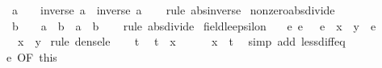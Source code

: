 \begin{isabellebody}
\ \ {\isachardoublequoteopen}a\ {\isasymnoteq}\ {}\ {\isasymLongrightarrow}\ {\isasymbar}inverse\ a{\isasymbar}\ {\isacharequal}{\kern0pt}\ inverse\ {\isasymbar}a{\isasymbar}{\isachardoublequoteclose}\isanewline
%
\isadelimproof
\ \ %
\endisadelimproof
%
\isatagproof
{}\isamarkupfalse%
\ {\isacharparenleft}{\kern0pt}rule\ abs{\isacharunderscore}{\kern0pt}inverse{\isacharparenright}{\kern0pt}%
\endisatagproof
{\isafoldproof}%
%
\isadelimproof
\isanewline
%
\endisadelimproof
\isanewline
{}\isamarkupfalse%
\ nonzero{\isacharunderscore}{\kern0pt}abs{\isacharunderscore}{\kern0pt}divide{\isacharcolon}{\kern0pt}\isanewline
\ \ {\isachardoublequoteopen}b\ {\isasymnoteq}\ {}\ {\isasymLongrightarrow}\ {\isasymbar}a\ {\isacharslash}{\kern0pt}\ b{\isasymbar}\ {\isacharequal}{\kern0pt}\ {\isasymbar}a{\isasymbar}\ {\isacharslash}{\kern0pt}\ {\isasymbar}b{\isasymbar}{\isachardoublequoteclose}\isanewline
%
\isadelimproof
\ \ %
\endisadelimproof
%
\isatagproof
{}\isamarkupfalse%
\ {\isacharparenleft}{\kern0pt}rule\ abs{\isacharunderscore}{\kern0pt}divide{\isacharparenright}{\kern0pt}%
\endisatagproof
{\isafoldproof}%
%
\isadelimproof
\isanewline
%
\endisadelimproof
\isanewline
{}\isamarkupfalse%
\ field{\isacharunderscore}{\kern0pt}le{\isacharunderscore}{\kern0pt}epsilon{\isacharcolon}{\kern0pt}\isanewline
\ \ \ e{\isacharcolon}{\kern0pt}\ {\isachardoublequoteopen}{\isasymAnd}e{\isachardot}{\kern0pt}\ {}\ {\isacharless}{\kern0pt}\ e\ {\isasymLongrightarrow}\ x\ {\isasymle}\ y\ {\isacharplus}{\kern0pt}\ e{\isachardoublequoteclose}\isanewline
\ \ \ {\isachardoublequoteopen}x\ {\isasymle}\ y{\isachardoublequoteclose}\isanewline
%
\isadelimproof
%
\endisadelimproof
%
\isatagproof
{}\isamarkupfalse%
\ {\isacharparenleft}{\kern0pt}rule\ dense{\isacharunderscore}{\kern0pt}le{\isacharparenright}{\kern0pt}\isanewline
\ \ \isamarkupfalse%
\ t\ \isamarkupfalse%
\ {\isachardoublequoteopen}t\ {\isacharless}{\kern0pt}\ x{\isachardoublequoteclose}\isanewline
\ \ \isamarkupfalse%
\ {\isachardoublequoteopen}{}\ {\isacharless}{\kern0pt}\ x\ {\isacharminus}{\kern0pt}\ t{\isachardoublequoteclose}\ \isamarkupfalse%
\ {\isacharparenleft}{\kern0pt}simp\ add{\isacharcolon}{\kern0pt}\ less{\isacharunderscore}{\kern0pt}diff{\isacharunderscore}{\kern0pt}eq{\isacharparenright}{\kern0pt}\isanewline
\ \ \isamarkupfalse%
\ e\ {\isacharbrackleft}{\kern0pt}OF\ this{\isacharbrackright}{\kern0pt}\ \isamarkupfalse%

\end{isabellebody}
